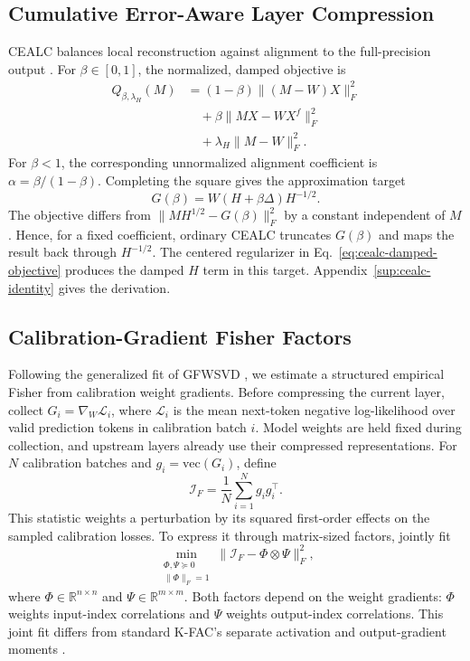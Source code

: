 \documentclass[11pt]{article}
\begin{document}
\subsection{Cumulative Error-Aware Layer Compression}\label{sec:cealc}

CEALC balances local reconstruction against alignment to the full-precision output \citep{hu2026saessvd}. For $\beta\in[0,1]$, the normalized, damped objective is
\begin{equation}
\begin{aligned}
Q_{\beta,\lambda_H}(M)
&=(1-\beta)\|(M-W)X\|_F^2\\
&\quad+\beta\|MX-WX^f\|_F^2\\
&\quad+\lambda_H\|M-W\|_F^2.
\end{aligned}
\label{eq:cealc-damped-objective}
\end{equation}
For $\beta<1$, the corresponding unnormalized alignment coefficient is $\alpha=\beta/(1-\beta)$. Completing the square gives the approximation target
\begin{equation}
G(\beta)=W(H+\beta\Delta)H^{-1/2}.
\label{eq:cealc-target}
\end{equation}
The objective differs from $\|MH^{1/2}-G(\beta)\|_F^2$ by a constant independent of $M$. Hence, for a fixed coefficient, ordinary CEALC truncates $G(\beta)$ and maps the result back through $H^{-1/2}$. The centered regularizer in Eq.~\eqref{eq:cealc-damped-objective} produces the damped $H$ term in this target. Appendix~\ref{sup:cealc-identity} gives the derivation.

\subsection{Calibration-Gradient Fisher Factors}\label{sec:fisher}

Following the generalized fit of GFWSVD \citep{chekalina2025gfwsvd}, we estimate a structured empirical Fisher from calibration weight gradients. Before compressing the current layer, collect $G_i=\nabla_W\mathcal L_i$, where $\mathcal L_i$ is the mean next-token negative log-likelihood over valid prediction tokens in calibration batch $i$. Model weights are held fixed during collection, and upstream layers already use their compressed representations. For $N$ calibration batches and $g_i=\mathrm{vec}(G_i)$, define
\begin{equation}
\mathcal I_F=\frac1N\sum_{i=1}^{N}g_i g_i^\top.
\label{eq:empirical-fisher}
\end{equation}
This statistic weights a perturbation by its squared first-order effects on the sampled calibration losses. To express it through matrix-sized factors, jointly fit
\begin{equation}
\min_{\substack{\Phi,\Psi\succeq0\\\|\Phi\|_F=1}}
\|\mathcal I_F-\Phi\otimes\Psi\|_F^2,
\label{eq:fisher-kron-fit}
\end{equation}
where $\Phi\in\mathbb R^{n\times n}$ and $\Psi\in\mathbb R^{m\times m}$. Both factors depend on the weight gradients: $\Phi$ weights input-index correlations and $\Psi$ weights output-index correlations. This joint fit differs from standard K-FAC's separate activation and output-gradient moments \citep{grosse2016kfac}.
\end{document}
